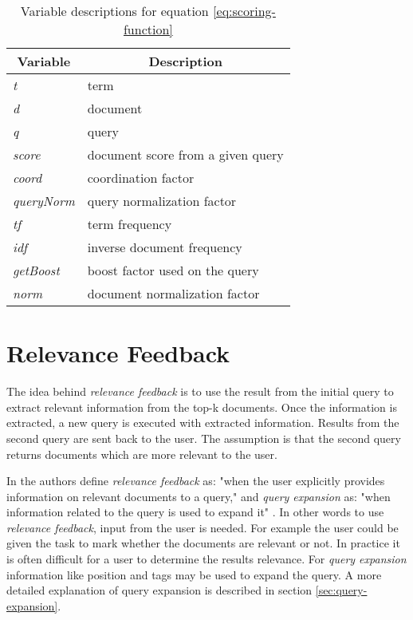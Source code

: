 \begin{table}
		\centering
    \begin{tabular}{|l|l|}
    \hline
		\multicolumn{1}{|c|}{\bfseries Variable} & \multicolumn{1}{c|}{\bfseries Description} \\ \hline
    \textit{t}         & term                           		\\ \hline
    \textit{d}         & document                       		\\ \hline
    \textit{q}         & query                          		\\ \hline
		\textit{score}     & document score from a given query	\\ \hline
    \textit{coord}     & coordination factor            		\\ \hline
    \textit{queryNorm} & query normalization factor     		\\ \hline
    \textit{tf}        & term frequency                 		\\ \hline
    \textit{idf}       & inverse document frequency     		\\ \hline
    \textit{getBoost}  & boost factor used on the query 		\\ \hline
    \textit{norm}      & document normalization factor  		\\ \hline
    \end{tabular}
		\caption{Variable descriptions for equation \ref{eq:scoring-function}}
		\label{tbl:scoring-function}
\end{table}

\section{Relevance Feedback}
The idea behind \textit{relevance feedback} is to use the result from the initial query to extract relevant information from the top-k documents.
Once the information is extracted, a new query is executed with extracted information.
Results from the second query are sent back to the user.
The assumption is that the second query returns documents which are more relevant to the user.

In \cite{ir-book} the authors define \textit{relevance feedback} as: "when the user explicitly provides information on relevant documents to a query,"
and \textit{query expansion} as: "when information related to the query is used to expand it" \cite[p. 177]{ir-book}.
In other words to use \textit{relevance feedback}, input from the user is needed.
For example the user could be given the task to mark whether the documents are relevant or not.
In practice it is often difficult for a user to determine the results relevance.
For \textit{query expansion} information like position and tags may be used to expand the query.
A more detailed explanation of query expansion is described in section \ref{sec:query-expansion}.

